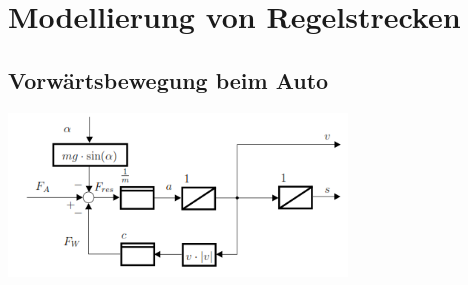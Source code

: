 \section{Modellierung von Regelstrecken}
\subsection{Vorwärtsbewegung beim Auto }
\begin{minipage}{8cm}	
\includegraphics[width=9cm]{./bilder/auto.png}
\end{minipage}
\begin{minipage}{8cm}
\end{minipage}
